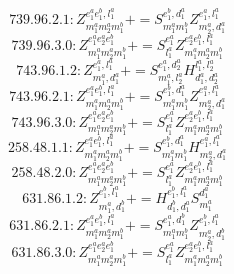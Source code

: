 \documentclass[letterpaper,10pt,fleqn,leqno,onecolumn]{article}
\begin{document}
\begin{equation} \;\;\;\;\;\;  739.96.2.1: Z^{e_{1}^{a}e_{1}^{b},l_{1}^{a}}_{m_{1}^{a}m_{2}^{a}m_{1}^{b}}+=S^{e_{1}^{b},d_{1}^{a}}_{m_{1}^{a}m_{1}^{b}}Z^{e_{1}^{a},l_{1}^{a}}_{m_{2}^{a},d_{1}^{a}} \end{equation}
\begin{equation} \;\;\;\;\;\;  739.96.3.0: Z^{e_{1}^{a}e_{2}^{a}e_{1}^{b}}_{m_{1}^{a}m_{2}^{a}m_{1}^{b}}+=S^{e_{1}^{a}}_{l_{1}^{a}}Z^{e_{2}^{a}e_{1}^{b},l_{1}^{a}}_{m_{1}^{a}m_{2}^{a}m_{1}^{b}} \end{equation}
\begin{equation} \;\;\;\;\;\;  743.96.1.2: Z^{e_{1}^{a},l_{1}^{a}}_{m_{1}^{a},d_{1}^{a}}+=S^{e_{1}^{a},d_{2}^{a}}_{m_{1}^{a},l_{2}^{a}}H^{l_{1}^{a},l_{2}^{a}}_{d_{1}^{a},d_{2}^{a}} \end{equation}
\begin{equation} \;\;\;\;\;\;  743.96.2.1: Z^{e_{1}^{a}e_{1}^{b},l_{1}^{a}}_{m_{1}^{a}m_{2}^{a}m_{1}^{b}}+=S^{e_{1}^{b},d_{1}^{a}}_{m_{1}^{a}m_{1}^{b}}Z^{e_{1}^{a},l_{1}^{a}}_{m_{2}^{a},d_{1}^{a}} \end{equation}
\begin{equation} \;\;\;\;\;\;  743.96.3.0: Z^{e_{1}^{a}e_{2}^{a}e_{1}^{b}}_{m_{1}^{a}m_{2}^{a}m_{1}^{b}}+=S^{e_{1}^{a}}_{l_{1}^{a}}Z^{e_{2}^{a}e_{1}^{b},l_{1}^{a}}_{m_{1}^{a}m_{2}^{a}m_{1}^{b}} \end{equation}
\begin{equation} \;\;\;\;\;\;  258.48.1.1: Z^{e_{1}^{a}e_{1}^{b},l_{1}^{a}}_{m_{1}^{a}m_{2}^{a}m_{1}^{b}}+=S^{e_{1}^{b},d_{1}^{a}}_{m_{1}^{a}m_{1}^{b}}H^{e_{1}^{a},l_{1}^{a}}_{m_{2}^{a},d_{1}^{a}} \end{equation}
\begin{equation} \;\;\;\;\;\;  258.48.2.0: Z^{e_{1}^{a}e_{2}^{a}e_{1}^{b}}_{m_{1}^{a}m_{2}^{a}m_{1}^{b}}+=S^{e_{1}^{a}}_{l_{1}^{a}}Z^{e_{2}^{a}e_{1}^{b},l_{1}^{a}}_{m_{1}^{a}m_{2}^{a}m_{1}^{b}} \end{equation}
\begin{equation} \;\;\;\;\;\;  631.86.1.2: Z^{e_{1}^{b},l_{1}^{a}}_{m_{1}^{a},d_{1}^{b}}+=H^{e_{1}^{b},l_{1}^{a}}_{d_{1}^{b},d_{1}^{a}}S^{d_{1}^{a}}_{m_{1}^{a}} \end{equation}
\begin{equation} \;\;\;\;\;\;  631.86.2.1: Z^{e_{1}^{a}e_{1}^{b},l_{1}^{a}}_{m_{1}^{a}m_{2}^{a}m_{1}^{b}}+=S^{e_{1}^{a},d_{1}^{b}}_{m_{1}^{a}m_{1}^{b}}Z^{e_{1}^{b},l_{1}^{a}}_{m_{2}^{a},d_{1}^{b}} \end{equation}
\begin{equation} \;\;\;\;\;\;  631.86.3.0: Z^{e_{1}^{a}e_{2}^{a}e_{1}^{b}}_{m_{1}^{a}m_{2}^{a}m_{1}^{b}}+=S^{e_{1}^{a}}_{l_{1}^{a}}Z^{e_{2}^{a}e_{1}^{b},l_{1}^{a}}_{m_{1}^{a}m_{2}^{a}m_{1}^{b}} \end{equation}
\end{document}
